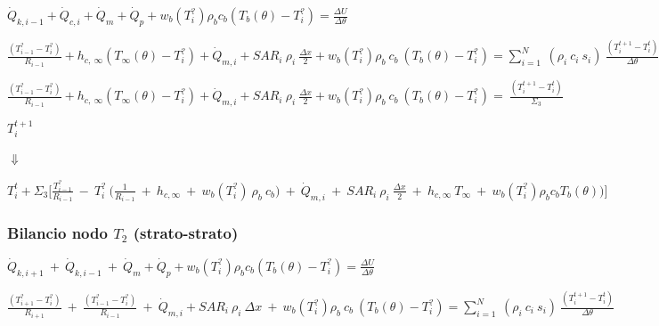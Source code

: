\begin{center}
	$ \Dot{Q} _{k, i-1} +\Dot{Q} _{c, i}+ \Dot{Q} _{m} +\Dot{Q} _{p}+ w_b (T_i^?) \rho _b c_b (T_b(\theta)-T_i ^?)= \frac{\Delta U}{\Delta \theta} $
\end{center}

\begin{center}
	$ \frac{(T_{i-1} ^? - T_i ^? )}{R_{i-1}} + h_{c, \:\infty} (T_{\infty} (\theta) - T_i ^? )+ \Dot{Q} _{m,i} + SAR_i \: \rho _{i} \: \frac{\Delta x}{2}  + w_b (T_i^?) \rho _b \: c_b \: (T_b(\theta)-T_i ^?) = \sum_{i=1}^N \: \left( \rho _{i} \: c_{i} \: s_i \right) \: \frac{(T_i ^{t+1} - T_i ^t )}{\Delta \theta}$
\end{center}

\begin{center}
	$ \frac{(T_{i-1} ^? - T_i ^? )}{R_{i-1}} + h_{c, \:\infty} (T_{\infty} (\theta) - T_i ^? )+ \Dot{Q} _{m,i} + SAR_i \: \rho _{i} \: \frac{\Delta x}{2}  + w_b (T_i^?) \rho _b \: c_b \: (T_b(\theta)-T_i ^?) =  \: \frac{(T_i ^{t+1} - T_i ^t )}{\Sigma_3}$
\end{center}

\begin{center}
	$T_i ^{t+1}$
	\begin{center}
		\begin{center}
			$\Downarrow$
		\end{center}
	\end{center}
	$T_i ^t + \Sigma_3 \Bigg[ \frac{T_{i-1}^?}{R_{i-1}} \:-\: T_i ^? \:\Big(\frac{1}{R_{i-1}} \:+\: h_{c, \infty} \:+\:  w_b (T_i^?) \: \rho _b \: c_b  \Big) \:+\: \Dot{Q}_{m,i} \:+\: SAR_i \: \rho_i \: \frac{\Delta x}{2} \:+\: h_{c, \infty} \: T_{\infty} \:+\:  w_b (T_i^?) \rho _b c_b T_b(\theta)\Big) \Bigg]$
\end{center}

\vspace{1cm}

\subsubsection*{Bilancio nodo $T_2$ (strato-strato)}

\begin{center}
	$ \Dot{Q} _{k, i+1} \:+\: \Dot{Q} _{k, i-1} \:+\: \Dot{Q} _{m} +\Dot{Q} _{p}+ w_b (T_i^?) \rho _b c_b (T_b(\theta)-T_i ^?)= \frac{\Delta U}{\Delta \theta} $
\end{center}

\begin{center}
	$ \frac{(T_{i+1} ^? - T_i ^? )}{R_{i+1}} \:+\:  \frac{(T_{i-1} ^? - T_i ^? )}{R_{i-1}} \:+\: \Dot{Q} _{m,i} + SAR_i \: \rho _{i} \: \Delta x  \:+\: w_b (T_i^?) \rho _b \: c_b \: (T_b(\theta)-T_i ^?) = \sum_{i=1}^N \: \left( \rho _{i} \: c_{i} \: s_i \right) \: \frac{(T_i ^{t+1} - T_i ^t )}{\Delta \theta}$
\end{center}

